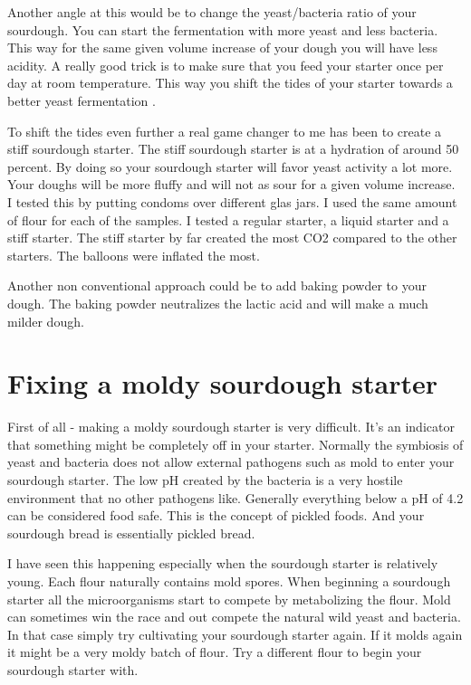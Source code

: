Another angle at this would be to change the yeast/bacteria
ratio of your sourdough. You can start the fermentation with
more yeast and less bacteria. This way for the same given
volume increase of your dough you will have less acidity.
A really good trick is to make sure that you feed your starter
once per day at room temperature. This way you shift
the tides of your starter towards a better yeast fermentation \cite*{more+active+starter}.

To shift the tides even further a real game changer
to me has been to create a stiff sourdough starter. The
stiff sourdough starter is at a hydration of around 50 percent.
By doing so your sourdough starter will favor yeast
activity a lot more. Your doughs will be more fluffy and will
not as sour for a given volume increase. I tested this
by putting condoms over different glas jars. I used
the same amount of flour for each of the samples.
I tested a regular starter, a liquid starter and a stiff
starter. The stiff starter by far created the most CO2
compared to the other starters. The balloons were inflated
the most. \cite{stiff+starter}

Another non conventional approach could be to add baking
powder to your dough. The baking powder neutralizes the
lactic acid and will make a much milder dough.\cite{baking+powder+reduce-acidity}

\section{Fixing a moldy sourdough starter}

First of all - making a moldy sourdough starter is very difficult.
It's an indicator that something might be completely off in your starter.
Normally the symbiosis of yeast and bacteria does not allow external
pathogens such as mold to enter your sourdough starter.
The low pH created by the bacteria is a very hostile environment
that no other pathogens like. Generally everything below a pH
of 4.2 can be considered food safe\cite{food-safe-ph}. This
is the concept of pickled foods. And your sourdough bread
is essentially pickled bread.

I have seen this happening especially when the sourdough
starter is relatively young. Each flour naturally contains
mold spores. When beginning a sourdough starter all
the microorganisms start to compete by metabolizing the
flour. Mold can sometimes win the race and out compete
the natural wild yeast and bacteria. In that case simply
try cultivating your sourdough starter again. If it molds
again it might be a very moldy batch of flour. Try a different
flour to begin your sourdough starter with.

